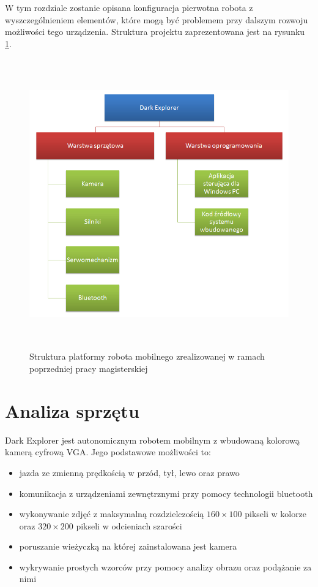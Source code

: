 W tym rozdziale zostanie opisana konfiguracja pierwotna robota z
wyszczególnieniem elementów, które mogą być problemem przy dalszym rozwoju
możliwości tego urządzenia.  Struktura projektu zaprezentowana jest na rysunku
\ref{fig:KmakPlatform}.

\begin{figure}[!ht]
 \centering \includegraphics[height=125mm]{../images/ch02/kmak_platform.png}
 \caption{Struktura platformy robota mobilnego zrealizowanej w ramach poprzedniej
 pracy magisterskiej\cite{KmakMScThesis2009}}
 \label{fig:KmakPlatform}
\end{figure}

\section{Analiza sprzętu}
Dark Explorer jest autonomicznym robotem mobilnym z wbudowaną kolorową kamerą
cyfrową VGA. Jego podstawowe możliwości to:
\begin{itemize}
 \item jazda ze zmienną prędkością w przód, tył, lewo oraz prawo
 \item komunikacja z urządzeniami zewnętrznymi przy pomocy technologii bluetooth
 \item wykonywanie zdjęć z maksymalną rozdzielczością $160\times100$ pikseli w
 kolorze oraz $320\times200$ pikseli w odcieniach szarości
 \item poruszanie wieżyczką na której zainstalowana jest kamera
 \item wykrywanie prostych wzorców przy pomocy analizy obrazu oraz podążanie za nimi
\end{itemize}

